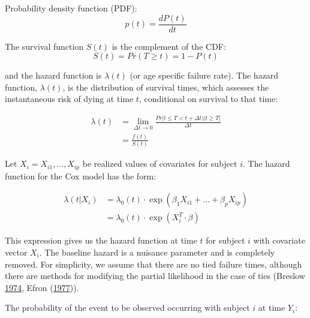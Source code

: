 \documentclass[]{DissertateOSU}
\begin{document}
\noindent Probability density function (PDF):\\

\begin{equation} \label{eq2}
p(t) = \frac{dP(t)}{dt} 
\end{equation}

\noindent The survival function \(S(t)\) is the complement of the CDF:\\

\begin{equation} \label{eq3}
S(t) = Pr(T \geq t) = 1 - P(t)
\end{equation}

\noindent and the hazard function is \(\lambda(t)\) (or age specific
failure rate). The hazard function, \(\lambda(t)\), is the distribution
of survival times, which assesses the instantaneous risk of dying at
time \(t\), conditional on survival to that time:

\begin{equation} \label{eq4}
\begin{split}
\lambda(t) & = \lim_{\Delta t \to 0}\frac{Pr\big[t \leq T < t + \Delta t) | t \geq T \big]}{\Delta t} \\
    & = \frac{f(t)}{S(t)}
\end{split}
\end{equation}

\noindent Let \(X_i = X_{i1}, ..., X_{ip}\) be realized values of
covariates for subject \(i\). The hazard function for the Cox model has
the form:

\begin{equation} \label{eq5}
\begin{split}
\lambda(t|X_i) & = \lambda_0(t) \cdot \exp(\beta_1 X_{i1} + ... + \beta_p X_{ip}) \\
& = \lambda_0(t) \cdot \exp(X_i^{T} \cdot \beta)
\end{split}
\end{equation}

\noindent This expression gives us the hazard function at time \(t\) for
subject \(i\) with covariate vector \(X_i\). The baseline hazard is a
nuisance parameter and is completely removed. For simplicity, we assume
that there are no tied failure times, although there are methods for
modifying the partial likelihood in the case of ties (Breslow
\protect\hyperlink{ref-breslow1974}{1974}, Efron
(\protect\hyperlink{ref-efron1977}{1977})).

The probability of the event to be observed occurring with subject \(i\)
at time \(Y_i\):
\end{document}
